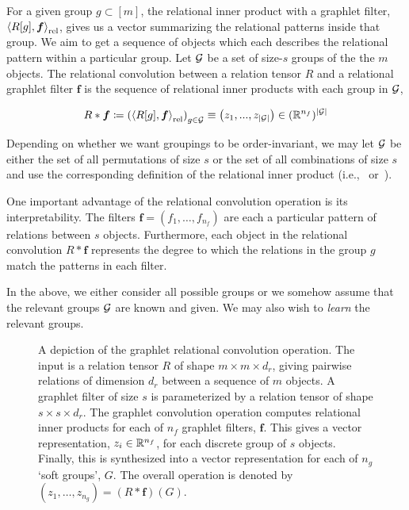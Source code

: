 For a given group $g \subset [m]$, the relational inner product with a graphlet filter, $\left \langle R[g], \bm{f} \right\rangle_\mathrm{rel}$, gives us a vector summarizing the relational patterns inside that group. We aim to get a sequence of objects which each describes the relational pattern within a particular group. Let ${\mathcal{G}}$ be a set of size-$s$ groups of the the $m$ objects. The relational convolution between a relation tensor $R$ and a relational graphlet filter $\bm{f}$ is the sequence of relational inner products with each group in ${\mathcal{G}}$,

\begin{equation}
    \label{eq:relational_convolution}
    R \ast \bm{f} \coloneq \left( \left\langle R[g], \boldsymbol{f} \right\rangle_\mathrm{rel} \right)_{g \in {\mathcal{G}}} \equiv \left(z_1, ..., z_{\left\lvert{\mathcal{G}}\right\rvert}\right) \in (\mathbb{R}^{n_f})^{\left\lvert{\mathcal{G}}\right\rvert}
\end{equation}

Depending on whether we want groupings to be order-invariant, we may let ${\mathcal{G}}$ be either the set of all permutations of size $s$ or the set of all combinations of size $s$ and use the corresponding definition of the relational inner product (i.e.,~ or~).

One important advantage of the relational convolution operation is its interpretability. The filters $\bm{f} = (f_1, \ldots, f_{n_f})$ are each a particular pattern of relations between $s$ objects. Furthermore, each object in the relational convolution $R \ast \bm{f}$ represents the degree to which the relations in the group $g$ match the patterns in each filter.

In the above, we either consider all possible groups or we somehow assume that the relevant groups ${\mathcal{G}}$ are known and given. We may also wish to \textit{learn} the relevant groups.

\begin{figure}[!ht]
    
    \caption{A depiction of the graphlet relational convolution operation. The input is a relation tensor $R$ of shape $m \times m \times d_r$, giving pairwise relations of dimension $d_r$ between a sequence of $m$ objects. A graphlet filter of size $s$ is parameterized by a relation tensor of shape $s \times s \times d_r$. The graphlet convolution operation computes relational inner products for each of $n_f$ graphlet filters, $\bm{f}$. This gives a vector representation, $z_i \in \mathbb{R}^{n_f}$, for each discrete group of $s$ objects. Finally, this is synthesized into a vector representation for each of $n_g$ `soft groups', $G$. The overall operation is denoted by $(z_1, \ldots, z_{n_g}) = (R \ast \bm{f})(G)$.}\label{fig:relconvdiagram}
\end{figure}


